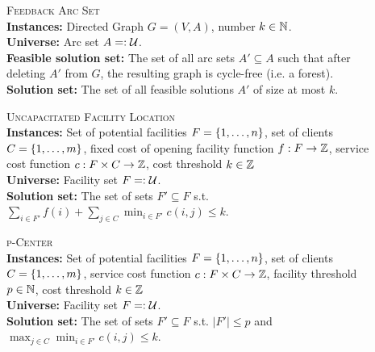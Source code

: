 \begin{samepage}
    \begin{mdframed}
    	\begin{description}
        \item[]\textsc{Feedback Arc Set}\hfill\\
        \textbf{Instances:} Directed Graph $G = (V, A)$, number $k \in \mathbb{N}$.\\
        \textbf{Universe:} Arc set $A =: \mathcal{U}$.\\
        \textbf{Feasible solution set:} The set of all arc sets $A' \subseteq A$ such that after deleting $A'$ from $G$, the resulting graph is cycle-free (i.e. a forest).\\
        \textbf{Solution set:} The set of all feasible solutions $A'$ of size at most $k$.
    	\end{description}
    \end{mdframed}
\end{samepage}

\begin{samepage}
    \begin{mdframed}
    	\begin{description} 
        \item[]\textsc{Uncapacitated Facility Location}\hfill\\
        \textbf{Instances:} Set of potential facilities $F = \{ 1, \ldots, n \}$, set of clients $C = \{ 1, \ldots, m \}$, fixed cost of opening facility function $f: F \rightarrow \mathbb{Z}$, service cost function $c: F \times C \rightarrow \mathbb{Z}$, cost threshold $k \in \mathbb{Z}$\\
        \textbf{Universe:} Facility set $F =: \mathcal{U}$.\\
        \textbf{Solution set:} The set of sets $F' \subseteq F$ s.t. $\sum_{i \in F'} f(i) + \sum_{j \in C} \min_{i \in F'} c(i, j) \leq k$.
    	\end{description}
    \end{mdframed}
\end{samepage}

\begin{samepage}
    \begin{mdframed}
    	\begin{description} 
        \item[]\textsc{p-Center}\hfill\\
        \textbf{Instances:} Set of potential facilities $F = \{ 1, \ldots, n \}$, set of clients $C = \{ 1, \ldots, m \}$, service cost function $c: F \times C \rightarrow \mathbb{Z}$, facility threshold $p \in \mathbb{N}$, cost threshold $k \in \mathbb{Z}$\\
        \textbf{Universe:} Facility set $F =: \mathcal{U}$.\\
        \textbf{Solution set:} The set of sets $F' \subseteq F$ s.t. $|F'| \leq p$ and $\max_{j \in C} \min_{i \in F'} c(i, j) \leq k$.
    	\end{description}
    \end{mdframed}
\end{samepage}

